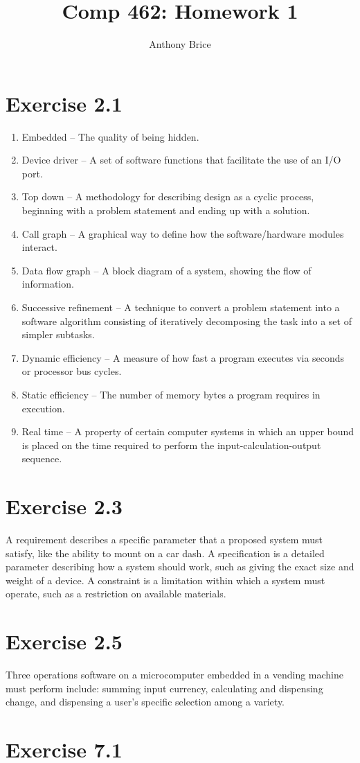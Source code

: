 \documentclass{abrice}
\title{Comp 462: Homework 1}
\author{Anthony Brice}
\begin{document}
\maketitle

\section{Exercise 2.1}

\begin{enumerate}[label=\alph*)]
\item Embedded -- The quality of being hidden.
\item Device driver -- A set of software functions that facilitate the use of
  an I/O port.
\item Top down -- A methodology for describing design as a cyclic process,
  beginning with a problem statement and ending up with a solution.
\item Call graph -- A graphical way to define how the software/hardware modules
  interact.
\item Data flow graph -- A block diagram of a system, showing the flow of
  information.
\item Successive refinement -- A technique to convert a problem statement into a
  software algorithm consisting of iteratively decomposing the task into a set
  of simpler subtasks.
\item Dynamic efficiency -- A measure of how fast a program executes via seconds
  or processor bus cycles.
\item Static efficiency -- The number of memory bytes a program requires in
  execution.
\item Real time -- A property of certain computer systems in which an upper
  bound is placed on the time required to perform the input-calculation-output
  sequence.
\end{enumerate}

\section{Exercise 2.3}

A requirement describes a specific parameter that a proposed system must
satisfy, like the ability to mount on a car dash. A specification is a detailed
parameter describing how a system should work, such as giving the exact size and
weight of a device. A constraint is a limitation within which a system must
operate, such as a restriction on available materials.

\section{Exercise 2.5}

Three operations software on a microcomputer embedded in a vending machine must
perform include: summing input currency, calculating and dispensing change, and
dispensing a user's specific selection among a variety.

\section{Exercise 7.1}
\end{document}
